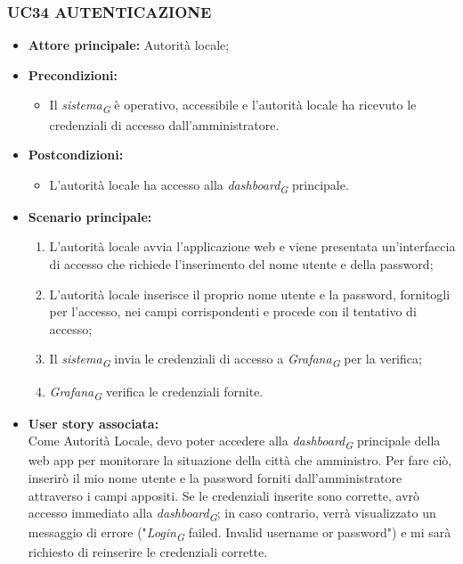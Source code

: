 \subsubsection{UC34 AUTENTICAZIONE}
\begin{itemize}
    \item \textbf{Attore principale:} Autorità locale;
    \item \textbf{Precondizioni:}
        \begin{itemize}
            \item Il \textit{sistema}\textsubscript{\textit{G}} è operativo, accessibile e l’autorità locale ha ricevuto le credenziali di accesso dall'amministratore.
        \end{itemize}
    \item \textbf{Postcondizioni:}
        \begin{itemize}
            \item L’autorità locale ha accesso alla \textit{dashboard}\textsubscript{\textit{G}} principale.
        \end{itemize}
    \item \textbf{Scenario principale:}
        \begin{enumerate}
            \item L'autorità locale avvia l'applicazione web e viene presentata un'interfaccia di accesso che richiede l'inserimento del nome utente e della password;
            \item L'autorità locale inserisce il proprio nome utente e la password, fornitogli per l’accesso, nei campi corrispondenti e procede con il tentativo di accesso;
            \item Il \textit{sistema}\textsubscript{\textit{G}} invia le credenziali di accesso a \textit{Grafana}\textsubscript{\textit{G}} per la verifica;
            \item \textit{Grafana}\textsubscript{\textit{G}} verifica le credenziali fornite.
        \end{enumerate}
    \item \textbf{User story associata:} \\
    Come Autorità Locale, devo poter accedere alla \textit{dashboard}\textsubscript{\textit{G}} principale della web app per monitorare la situazione della città che amministro. Per fare ciò, inserirò il mio nome utente e la password forniti dall'amministratore attraverso i campi appositi. Se le credenziali inserite sono corrette, avrò accesso immediato alla \textit{dashboard}\textsubscript{\textit{G}}; in caso contrario, verrà visualizzato un messaggio di errore ("\textit{Login}\textsubscript{\textit{G}} failed. Invalid username or password") e mi sarà richiesto di reinserire le credenziali corrette.
\end{itemize}